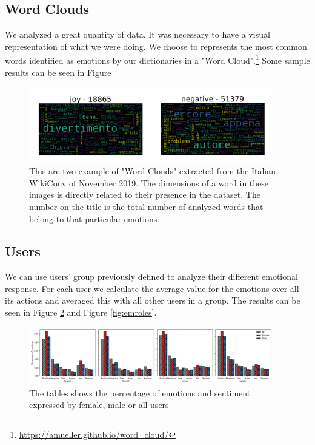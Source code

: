 \subsection{Word Clouds}
We analyzed a great quantity of data. It was necessary to have a visual representation of what we were doing. We choose to represents the most common words identified as emotions by our dictionaries in a "Word Cloud".\footnote{\url{https://amueller.github.io/word_cloud/}} Some sample results can be seen in Figure

\begin{figure}[H]
    \centering
    \includegraphics[width=0.95\textwidth]{./img/cloud.png}
    \caption{ This are two example of "Word Clouds" extracted from the Italian WikiConv of November 2019. The dimensions of a word in these images is directly related to their presence in the dataset. The number on the title is the total number of analyzed words that belong to that particular emotions. }
    \label{fig:cloud}
\end{figure}


\subsection{Users}
\label{sec:resusers}
We can use users' group previously defined to analyze their different emotional response. For each user we calculate the average value for the emotions over all its actions and averaged this with all other users in a group. The results can be seen in Figure \ref{fig:emgender} and Figure \ref{fig:emroles}.

\begin{figure}[H]
    \centering
    \includegraphics[width=0.95\textwidth]{./img/emgender.jpg}
    \caption{ The tables shows the percentage of emotions and sentiment expressed by female, male or all users }
    \label{fig:emgender}
\end{figure}

